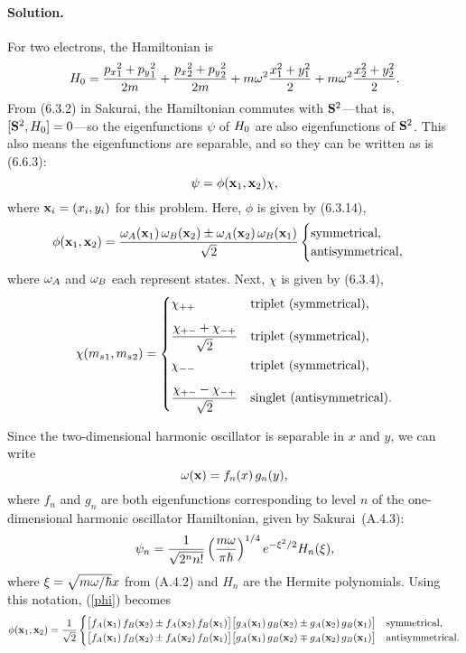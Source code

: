 \documentclass[11pt]{article}
\newcommand{\refeq}[1]{(\ref{#1})}
\newcommand{\beq}{\begin{equation*}}
\newcommand{\eeq}{\end{equation*}}
\newcommand{\beqn}{\begin{equation}}
\newcommand{\eeqn}{\end{equation}}
\newenvironment{solution}
{
    \paragraph{Solution.}
    \ignorespaces
}
{
}
\begin{document}
\begin{solution}
	For two electrons, the Hamiltonian is
	\beq
		\Ho = \frac{\pxq^2 + \pyq^2}{2m} + \frac{\pxw^2 + \pyw^2}{2m} + m \omg^2 \frac{\xq^2 + \yq^2}{2} + m \omg^2 \frac{\xw^2 + \yw^2}{2}.
	\eeq
	From (6.3.2) in Sakurai, the Hamiltonian commutes with $\vb{S}^2$---that is, $[\vb{S}^2, H_0] = 0$---so the eigenfunctions $\psi$ of $H_0$ are also eigenfunctions of $\vb{S}^2$.  This also means the eigenfunctions are separable, and so they can be written as is (6.6.3):
	\beqn \label{psi}
		\psi = \phi(\vxq, \vxw) \chi,
	\eeqn
	where $\vb{x}_i = (x_i, y_i)$ for this problem.  Here, $\phi$ is given by (6.3.14),
	\beqn \label{phi}
		\phi(\vxq, \vxw) = \frac{\omgA(\vxq) \, \omgB(\vxw) \pm \omgA(\vxw) \, \omgB(\vxq)}{\sqrt{2}} \begin{cases}
			\text{symmetrical}, \\
			\text{antisymmetrical},
		\end{cases}
	\eeqn
	where $\omega_A$ and $\omega_B$ each represent states.  Next, $\chi$ is given by (6.3.4),
	\beq
		\chi(\msq, \msw) = \begin{cases}
			\chi_{+ +} & \text{triplet (symmetrical)}, \\[2ex]
			\dfrac{\chi_{+ -} + \chi_{- +}}{\sqrt{2}} & \text{triplet (symmetrical)}, \\[2ex]
			\chi_{- -} & \text{triplet (symmetrical)}, \\[2ex]
			\dfrac{\chi_{+ -} - \chi_{- +}}{\sqrt{2}} & \text{singlet (antisymmetrical)}.
		\end{cases}
	\eeq
	
	Since the two-dimensional harmonic oscillator is separable in $x$ and $y$, we can write
	\beq
		\omg(\vx) = f_n(x) \, g_n(y),
	\eeq
	where $f_n$ and $g_n$ are both eigenfunctions corresponding to level $n$ of the one-dimensional harmonic oscillator Hamiltonian, given by Sakurai~(A.4.3):
	\beq
		\psi_n = \frac{1}{\sqrt{2^n n!}} \left( \frac{m \omg}{\pi \hbar} \right)^{1/4} e^{-\xi^2 / 2} H_n(\xi),
	\eeq
	where $\xi = \sqrt{m \omega / \hbar} x$ from (A.4.2) and $H_n$ are the Hermite polynomials.  Using this notation, \refeq{phi} becomes
	\beqn \label{phi2}
		\phi(\vxq, \vxw) = \frac{1}{\sqrt{2}} \begin{cases}
			\big[ \fA(\vxq) \, \fB(\vxw) \pm \fA(\vxw) \, \fB(\vxq) \big] \big[ \gA(\vxq) \, \gB(\vxw) \pm \gA(\vxw) \, \gB(\vxq) \big] & \text{symmetrical}, \\
			\big[ \fA(\vxq) \, \fB(\vxw) \pm \fA(\vxw) \, \fB(\vxq) \big] \big[ \gA(\vxq) \, \gB(\vxw) \mp \gA(\vxw) \, \gB(\vxq) \big] & \text{antisymmetrical}.
		\end{cases}
	\eeqn
	

\end{solution}
\end{document}
